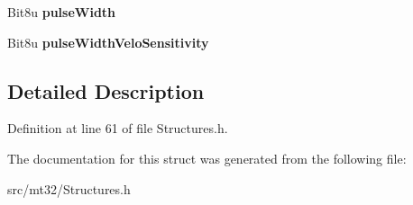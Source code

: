 \begin{DoxyCompactItemize}
\item 
\hypertarget{structMT32Emu_1_1TimbreParam_1_1PartialParam_1_1WGParam_ad7a3aa0c7fad0c6f27b4c54f43bdb095}{Bit8u {\bfseries pulse\-Width}}\label{structMT32Emu_1_1TimbreParam_1_1PartialParam_1_1WGParam_ad7a3aa0c7fad0c6f27b4c54f43bdb095}

\item 
\hypertarget{structMT32Emu_1_1TimbreParam_1_1PartialParam_1_1WGParam_a16c01ea1b1c3846a2af64f485b35b806}{Bit8u {\bfseries pulse\-Width\-Velo\-Sensitivity}}\label{structMT32Emu_1_1TimbreParam_1_1PartialParam_1_1WGParam_a16c01ea1b1c3846a2af64f485b35b806}

\end{DoxyCompactItemize}


\subsection{Detailed Description}


Definition at line 61 of file Structures.\-h.



The documentation for this struct was generated from the following file\-:\begin{DoxyCompactItemize}
\item 
src/mt32/Structures.\-h\end{DoxyCompactItemize}
